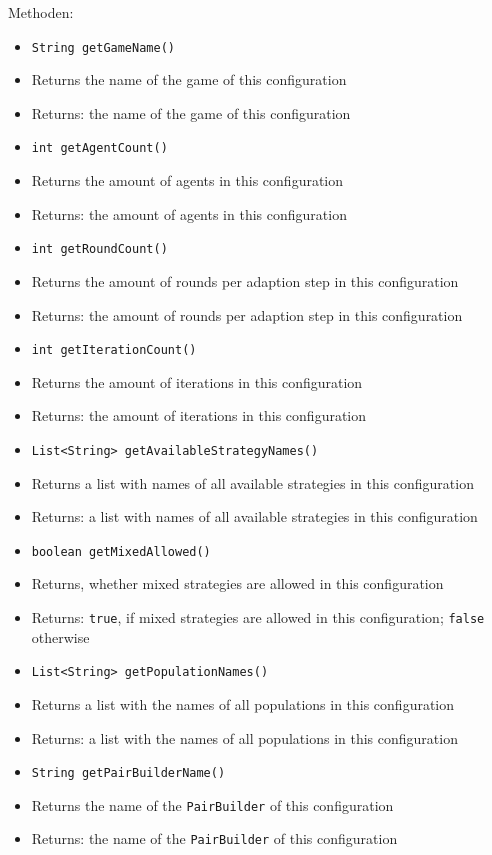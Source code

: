 \documentclass[parskip=full,11pt]{scrartcl}
\begin{document}
Methoden:
\begin{itemize}\itemsep -10pt
	\item \texttt{String getGameName()}
	\item[] Returns the name of the game of this configuration
	\item[] Returns: the name of the game of this configuration
	
	\item \texttt{int getAgentCount()}
	\item[] Returns the amount of agents in this configuration
	\item[] Returns: the amount of agents in this configuration
	
	\item \texttt{int getRoundCount()}
	\item[] Returns the amount of rounds per adaption step in this configuration
	\item[] Returns: the amount of rounds per adaption step in this configuration
	
	\item \texttt{int getIterationCount()}
	\item[] Returns the amount of iterations in this configuration
	\item[] Returns: the amount of iterations in this configuration
	
	\item \texttt{List<String> getAvailableStrategyNames()}
	\item[] Returns a list with names of all available strategies in this configuration
	\item[] Returns: a list with names of all available strategies in this configuration
	
	\item \texttt{boolean getMixedAllowed()}
	\item[] Returns, whether mixed strategies are allowed in this configuration
	\item[] Returns: \texttt{true}, if mixed strategies are allowed in this configuration; \texttt{false} otherwise
	
	\item \texttt{List<String> getPopulationNames()}
	\item[] Returns a list with the names of all populations in this configuration
	\item[] Returns: a list with the names of all populations in this configuration
	
	\item \texttt{String getPairBuilderName()}
	\item[] Returns the name of the \texttt{PairBuilder} of this configuration
	\item[] Returns: the name of the \texttt{PairBuilder} of this configuration
	

\end{itemize}
\end{document}
